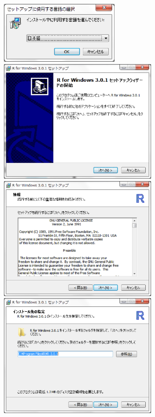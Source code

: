 \documentclass[a4paper,10pt,fleqn]{jarticle}
\begin{document}
\includegraphics[width=6cm]{img/windows/win002.eps}\hspace{0.8em} \includegraphics[width=8cm]{img/windows/win003.eps}\\

\includegraphics[width=8cm]{img/windows/win004.eps}\hspace{0.8em} \includegraphics[width=8cm]{img/windows/win005.eps}\\
\end{document}

